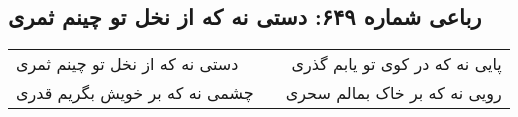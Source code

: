 \begin{center}
\section*{رباعی شماره ۶۴۹: دستی نه که از نخل تو چینم ثمری}
\label{sec:sh649}
\begin{longtable}{l p{0.5cm} r}
دستی نه که از نخل تو چینم ثمری
&&
پایی نه که در کوی تو یابم گذری
\\
چشمی نه که بر خویش بگریم قدری
&&
رویی نه که بر خاک بمالم سحری
\\
\end{longtable}
\end{center}
